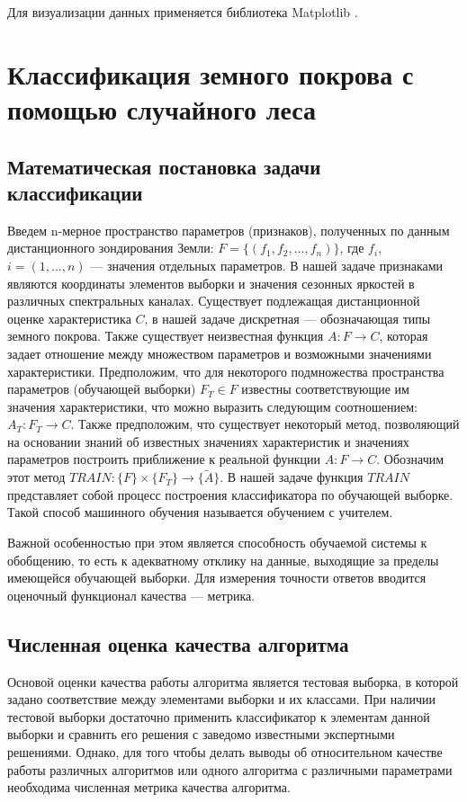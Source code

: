 \documentclass[14pt, a4paper, oneside]{extarticle}
\begin{document}
Для визуализации данных применяется библиотека Matplotlib \cite{matplotlib}.

\newpage

\section{Классификация земного покрова с помощью случайного леса}
\subsection{Математическая постановка задачи классификации}
Введем n-мерное пространство параметров (признаков), полученных по данным дистанционного зондирования Земли: $F=\{(f_1, f_2, ..., f_n)\}$, где $f_i$, $i=(1, ..., n)$ --- значения отдельных параметров. В нашей задаче признаками являются координаты элементов выборки и значения сезонных яркостей в различных спектральных каналах. Существует подлежащая дистанционной оценке характеристика $C$, в нашей задаче дискретная --- обозначающая типы земного покрова. Также существует неизвестная функция $A: F \to C$, которая задает отношение между множеством параметров и возможными значениями характеристики. Предположим, что для некоторого подмножества пространства параметров (обучающей выборки) $F_T \in F$ известны соответствующие им значения характеристики, что можно выразить следующим соотношением: $A_T: F_T \to C$. Также предположим, что существует некоторый метод, позволяющий на основании знаний об известных значениях характеристик и значениях параметров построить приближение к реальной функции $A: F \to C$. Обозначим этот метод $TRAIN: \{F\} \times \{F_T\} \to \{\widetilde{A}\}$. В нашей задаче функция $TRAIN$ представляет собой процесс построения классификатора по обучающей выборке. Такой способ машинного обучения называется обучением с учителем.

Важной особенностью при этом является способность обучаемой системы к обобщению, то есть к адекватному отклику на данные, выходящие за пределы имеющейся обучающей выборки. Для измерения точности ответов вводится оценочный функционал качества --- метрика.

\subsection{Численная оценка качества алгоритма}
Основой оценки качества работы алгоритма является тестовая выборка, в которой задано соответствие между элементами выборки и их классами. При наличии тестовой выборки достаточно применить классификатор к элементам данной выборки и сравнить его решения с заведомо известными экспертными решениями. Однако, для того чтобы делать выводы об относительном качестве работы различных алгоритмов или одного алгоритма с различными параметрами необходима численная метрика качества алгоритма.
\end{document}
